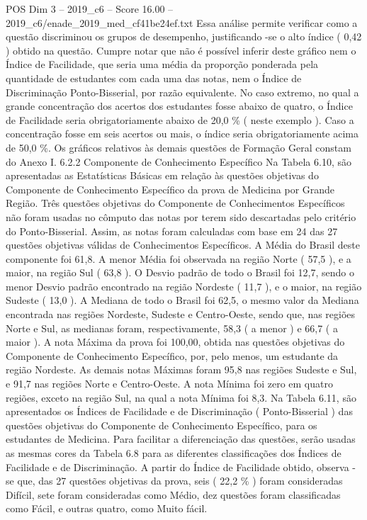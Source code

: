 \begin{textsample}{POS Dim 3 – 2019\_c6 – Score 16.00 – 2019\_c6/enade\_2019\_med\_cf41be24ef.txt}
Essa análise permite verificar como a questão discriminou os grupos de desempenho, justificando -se o alto índice ( 0,42 ) obtido na questão.
Cumpre notar que não é possível inferir deste gráfico nem o Índice de Facilidade, que seria uma média da proporção ponderada pela quantidade de estudantes com cada uma das notas, nem o Índice de Discriminação Ponto-Bisserial, por razão equivalente.
No caso extremo, no qual a grande concentração dos acertos dos estudantes fosse abaixo de quatro, o Índice de Facilidade seria obrigatoriamente abaixo de 20,0 \% ( neste exemplo ).
Caso a concentração fosse em seis acertos ou mais, o índice seria obrigatoriamente acima de 50,0 \%.
Os gráficos relativos às demais questões de Formação Geral constam do Anexo I. 6.2.2 Componente de Conhecimento Específico Na Tabela 6.10, são apresentadas as Estatísticas Básicas em relação às questões objetivas do Componente de Conhecimento Específico da prova de Medicina por Grande Região.
Três questões objetivas do Componente de Conhecimentos Específicos não foram usadas no cômputo das notas por terem sido descartadas pelo critério do Ponto-Bisserial.
Assim, as notas foram calculadas com base em 24 das 27 questões objetivas válidas de Conhecimentos Específicos.
A Média do Brasil deste componente foi 61,8.
A menor Média foi observada na região Norte ( 57,5 ), e a maior, na região Sul ( 63,8 ).
O Desvio padrão de todo o Brasil foi 12,7, sendo o menor Desvio padrão encontrado na região Nordeste ( 11,7 ), e o maior, na região Sudeste ( 13,0 ).
A Mediana de todo o Brasil foi 62,5, o mesmo valor da Mediana encontrada nas regiões Nordeste, Sudeste e Centro-Oeste, sendo que, nas regiões Norte e Sul, as medianas foram, respectivamente, 58,3 ( a menor ) e 66,7 ( a maior ).
A nota Máxima da prova foi 100,00, obtida nas questões objetivas do Componente de Conhecimento Específico, por, pelo menos, um estudante da região Nordeste.
As demais notas Máximas foram 95,8 nas regiões Sudeste e Sul, e 91,7 nas regiões Norte e Centro-Oeste.
A nota Mínima foi zero em quatro regiões, exceto na região Sul, na qual a nota Mínima foi 8,3.
Na Tabela 6.11, são apresentados os Índices de Facilidade e de Discriminação ( Ponto-Bisserial ) das questões objetivas do Componente de Conhecimento Específico, para os estudantes de Medicina.
Para facilitar a diferenciação das questões, serão usadas as mesmas cores da Tabela 6.8 para as diferentes classificações dos Índices de Facilidade e de Discriminação.
A partir do Índice de Facilidade obtido, observa -se que, das 27 questões objetivas da prova, seis ( 22,2 \% ) foram consideradas Difícil, sete foram consideradas como Médio, dez questões foram classificadas como Fácil, e outras quatro, como Muito fácil.

\end{textsample}
